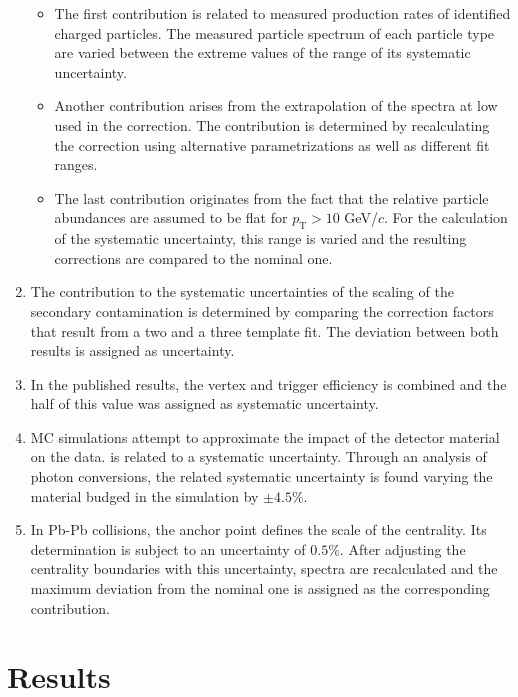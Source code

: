 \documentclass[12pt,a4paper]{report}
\begin{document}
\begin{enumerate}
\begin{itemize}
\item The first contribution is related to measured production rates of identified charged particles. The measured particle spectrum of each particle type are varied between the extreme values of the range of its systematic uncertainty.
\item Another contribution arises from the extrapolation of the \pt spectra at low \pt used in the correction. The contribution is determined by recalculating the correction using alternative parametrizations as well as different fit ranges.
\item The last contribution originates from the fact that the relative particle abundances are assumed to be flat for $p_\text{T} > 10$ GeV/$c$. For the calculation of the systematic uncertainty, this range is varied and the resulting corrections are compared to the nominal one.  
\end{itemize} 
\item The contribution to the systematic uncertainties of the scaling of the secondary contamination is determined by comparing the correction factors that result from a two and a three template fit. The deviation between both results is assigned as uncertainty.
\item In the published results, the vertex and trigger efficiency is combined and the half of this value was assigned as systematic uncertainty.
\item MC simulations attempt to approximate the impact of the detector material on the data.  is related to a systematic uncertainty. Through an analysis of photon conversions, the related systematic uncertainty is found varying the material budged in the simulation by $\pm 4.5\%$.
\item In Pb-Pb collisions, the anchor point defines the scale of the centrality. Its determination is subject to an uncertainty of $0.5\%$. After adjusting the centrality boundaries with this uncertainty, \pt spectra are recalculated and the maximum deviation from the nominal one is assigned as the corresponding contribution.
\end{enumerate} 

\section{Results}
\end{document}
